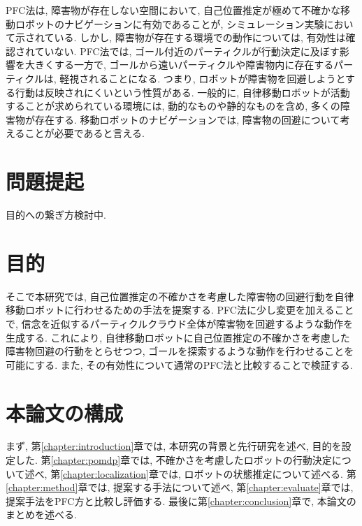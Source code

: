 PFC法は, 障害物が存在しない空間において, 自己位置推定が極めて不確かな移動ロボットのナビゲーションに有効であることが, シミュレーション実験において示されている. 
しかし, 障害物が存在する環境での動作については, 有効性は確認されていない. 
PFC法では, ゴール付近のパーティクルが行動決定に及ぼす影響を大きくする一方で, 
ゴールから遠いパーティクルや障害物内に存在するパーティクルは, 軽視されることになる. 
つまり, ロボットが障害物を回避しようとする行動は反映されにくいという性質がある. 
一般的に, 自律移動ロボットが活動することが求められている環境には, 動的なものや静的なものを含め, 多くの障害物が存在する. 
移動ロボットのナビゲーションでは, 障害物の回避について考えることが必要であると言える. 


\section{問題提起}
目的への繋ぎ方検討中. 




\section{目的}
そこで本研究では, 自己位置推定の不確かさを考慮した障害物の回避行動を自律移動ロボットに行わせるための手法を提案する. 
PFC法に少し変更を加えることで, 信念を近似するパーティクルクラウド全体が障害物を回避するような動作を生成する. 
これにより, 自律移動ロボットに自己位置推定の不確かさを考慮した障害物回避の行動をとらせつつ, ゴールを探索するような動作を行わせることを可能にする. 
また, その有効性について通常のPFC法と比較することで検証する. 


\section{本論文の構成}
まず, 第\ref{chapter:introduction}章では, 本研究の背景と先行研究を述べ, 目的を設定した. 
第\ref{chapter:pomdp}章では, 不確かさを考慮したロボットの行動決定について述べ, 
第\ref{chapter:localization}章では, ロボットの状態推定について述べる. 
第\ref{chapter:method}章では, 提案する手法について述べ, 
第\ref{chapter:evaluate}章では, 提案手法をPFC方と比較し評価する. 
最後に第\ref{chapter:conclusion}章で, 本論文のまとめを述べる. 


